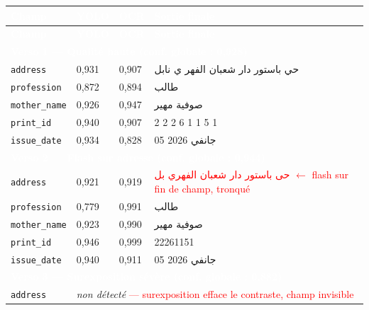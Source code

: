 \renewcommand{\arraystretch}{1.25}
\setlength{\LTleft}{0pt plus 1fill}
\setlength{\LTright}{0pt plus 1fill}
\begin{longtable}{|p{3cm}|p{1.8cm}|p{1.8cm}|p{7.5cm}|}
  \rowcolor{bleu_principal}
  \textcolor{white}{\textbf{Champ}} &
  \textcolor{white}{\textbf{YOLO}} &
  \textcolor{white}{\textbf{OCR}} &
  \textcolor{white}{\textbf{Sortie finale}} \\
  \hline
  \endfirsthead
  \rowcolor{bleu_principal}
  \textcolor{white}{\textbf{Champ}} &
  \textcolor{white}{\textbf{YOLO}} &
  \textcolor{white}{\textbf{OCR}} &
  \textcolor{white}{\textbf{Sortie finale}} \\
  \hline
  \endhead
  \multicolumn{4}{|p{14.2cm}|}{\cellcolor{bleu_principal}\textcolor{white}{\textbf{Verso 1 --- Qualité haute (conf. globale : 0,928)}}} \\ \hline
  \texttt{address}      & 0,931 & 0,907 & \textarabic{حي باستور دار شعبان الفهر ي نابل} \\ \hline
  \texttt{profession}   & 0,872 & 0,894 & \textarabic{طالب} \\ \hline
  \texttt{mother\_name} & 0,926 & 0,947 & \textarabic{صوفية مهير} \\ \hline
  \texttt{print\_id}    & 0,940 & 0,907 & 2 2 2 6 1 1 5 1 \\ \hline
  \texttt{issue\_date}  & 0,934 & 0,828 & \textarabic{05 جانفي 2026} \\ \hline
  \multicolumn{4}{|p{14.2cm}|}{\cellcolor{bleu_principal}\textcolor{white}{\textbf{Verso 2 --- Flash sur adresse (conf. globale : 0,944)}}} \\ \hline
  \texttt{address}      & 0,921 & 0,919 & \textcolor{red}{\textarabic{حى باستور دار شعبان الفهري بل}} \textcolor{red}{\small$\leftarrow$ flash sur fin de champ, tronqué} \\ \hline
  \texttt{profession}   & 0,779 & 0,991 & \textarabic{طالب} \\ \hline
  \texttt{mother\_name} & 0,923 & 0,990 & \textarabic{صوفية مهير} \\ \hline
  \texttt{print\_id}    & 0,946 & 0,999 & 22261151 \\ \hline
  \texttt{issue\_date}  & 0,940 & 0,911 & \textarabic{05 جانفي 2026} \\ \hline
  \multicolumn{4}{|p{14.2cm}|}{\cellcolor{bleu_principal}\textcolor{white}{\textbf{Verso 3 --- Surexposition sévère (conf. globale : 0,882)}}} \\ \hline
  \texttt{address}      & \multicolumn{3}{p{11.1cm}|}{\textit{non détecté} \textcolor{red}{\small--- surexposition efface le contraste, champ invisible}} \\ \hline

\end{longtable}
